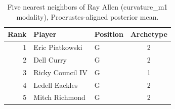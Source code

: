 \begin{table}[htbp]
  \centering\small
  \begin{tabular}{rllc}
    \toprule
    Rank & Player & Position & Archetype \\
    \midrule
    1 & Eric Piatkowski & G & 2 \\
    2 & Dell Curry & G & 2 \\
    3 & Ricky Council IV & G & 1 \\
    4 & Ledell Eackles & G & 2 \\
    5 & Mitch Richmond & G & 2 \\
    \bottomrule
  \end{tabular}
  \caption{Five nearest neighbors of Ray Allen (curvature_m1 modality), Procrustes-aligned posterior mean.}
  \label{tab:Ray_Allen_neighbors_curvature_m1}
\end{table}

